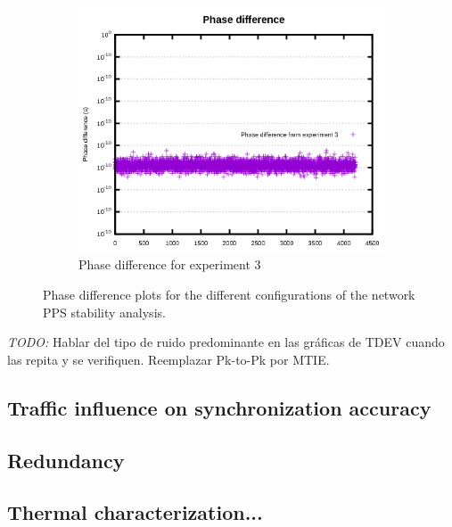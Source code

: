 \begin{figure}[H]
    ~
    \begin{subfigure}[t]{.3\textwidth}
        \centering
        \includegraphics[width=\textwidth]{img/prueba3_pd.png}
        \caption{Phase difference for experiment 3}
        \label{fig:prueba3_pd}
    \end{subfigure}
    \caption{Phase difference plots for the different configurations of the network PPS stability analysis.}
\end{figure}

\textit{TODO:} Hablar del tipo de ruido predominante en las gráficas de TDEV cuando las repita y se verifiquen. Reemplazar Pk-to-Pk por MTIE.

\subsection{Traffic influence on synchronization accuracy}


\subsection{Redundancy}


\subsection{Thermal characterization...}


 
